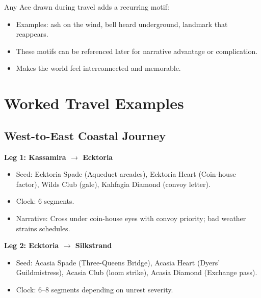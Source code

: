 Any Ace drawn during travel adds a recurring motif:
\begin{itemize}
\item Examples: ash on the wind, bell heard underground, landmark that reappears.
\item These motifs can be referenced later for narrative advantage or complication.
\item Makes the world feel interconnected and memorable.
\end{itemize}

\section{Worked Travel Examples}
\label{sec:worked-examples}

\subsection{West-to-East Coastal Journey}
\label{subsec:coastal-journey}

\textbf{Leg 1: Kassamira $\rightarrow$ Ecktoria}
\begin{itemize}
\item Seed: Ecktoria Spade (Aqueduct arcades), Ecktoria Heart (Coin-house factor), Wilds Club (gale), Kahfagia Diamond (convoy letter).
\item Clock: 6 segments.
\item Narrative: Cross under coin-house eyes with convoy priority; bad weather strains schedules.
\end{itemize}

\textbf{Leg 2: Ecktoria $\rightarrow$ Silkstrand}
\begin{itemize}
\item Seed: Acasia Spade (Three-Queens Bridge), Acasia Heart (Dyers' Guildmistress), Acasia Club (loom strike), Acasia Diamond (Exchange pass).
\item Clock: 6–8 segments depending on unrest severity.
\end{itemize}

